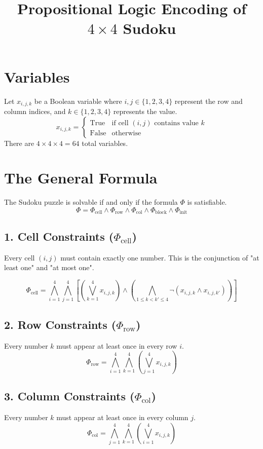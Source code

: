 \documentclass[12pt,a4paper]{article}
\title{\textbf{Propositional Logic Encoding of $4 \times 4$ Sudoku}}
\author{}
\date{}
\begin{document}
\maketitle

\section{Variables}
Let $x_{i,j,k}$ be a Boolean variable where $i, j \in \{1, 2, 3, 4\}$ represent the row and column indices, and $k \in \{1, 2, 3, 4\}$ represents the value.
$$ x_{i,j,k} = \begin{cases} \text{True} & \text{if cell }(i,j) \text{ contains value } k \\ \text{False} & \text{otherwise} \end{cases} $$
There are $4 \times 4 \times 4 = 64$ total variables.

\section{The General Formula}
The Sudoku puzzle is solvable if and only if the formula $\Phi$ is satisfiable.
$$ \Phi = \Phi_{\text{cell}} \land \Phi_{\text{row}} \land \Phi_{\text{col}} \land \Phi_{\text{block}} \land \Phi_{\text{init}} $$

\subsection{1. Cell Constraints ($\Phi_{\text{cell}}$)}
Every cell $(i, j)$ must contain exactly one number. This is the conjunction of "at least one" and "at most one".

$$ \Phi_{\text{cell}} = \bigwedge_{i=1}^4 \bigwedge_{j=1}^4 \left[ \left( \bigvee_{k=1}^4 x_{i,j,k} \right) \land \left( \bigwedge_{1 \le k < k' \le 4} \neg (x_{i,j,k} \land x_{i,j,k'}) \right) \right] $$

\subsection{2. Row Constraints ($\Phi_{\text{row}}$)}
Every number $k$ must appear at least once in every row $i$.
$$ \Phi_{\text{row}} = \bigwedge_{i=1}^4 \bigwedge_{k=1}^4 \left( \bigvee_{j=1}^4 x_{i,j,k} \right) $$

\subsection{3. Column Constraints ($\Phi_{\text{col}}$)}
Every number $k$ must appear at least once in every column $j$.
$$ \Phi_{\text{col}} = \bigwedge_{j=1}^4 \bigwedge_{k=1}^4 \left( \bigvee_{i=1}^4 x_{i,j,k} \right) $$
\end{document}
